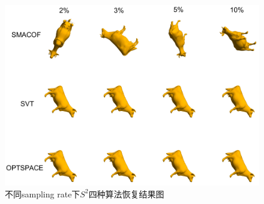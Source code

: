 \begin{figure}[h]
	\centering
	\includegraphics[width=1.2\textwidth]{figure/Cow.png}
	\caption{不同sampling rate下$S^2$四种算法恢复结果图}
 	\label{fig:cow}
\end{figure}
